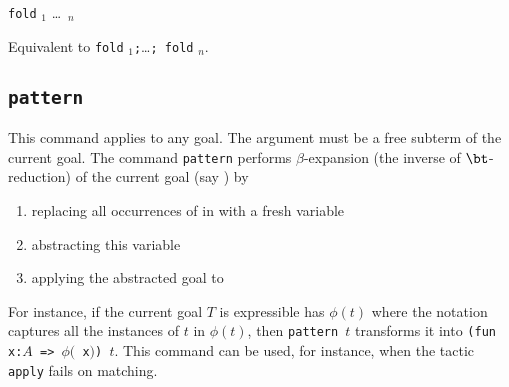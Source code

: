 \begin{Variants}
\item {\tt fold} \term$_1$ \dots\ \term$_n$ 
  
  Equivalent to {\tt fold} \term$_1${\tt;}\ldots{\tt; fold} \term$_n$.
\end{Variants}

\subsection{{\tt pattern {\term}}
\label{pattern}}

This command applies to any goal. The argument {\term} must be a free
subterm of the current goal.  The command {\tt pattern} performs
$\beta$-expansion (the inverse of $\bt$-reduction) of the current goal
(say \T) by
\begin{enumerate}
\item replacing all occurrences of {\term} in {\T} with a fresh variable
\item abstracting this variable
\item applying the abstracted goal to {\term}
\end{enumerate}

For instance, if the current goal $T$ is expressible has $\phi(t)$
where the notation captures all the instances of $t$ in $\phi(t)$,
then {\tt pattern $t$} transforms it into {\tt (fun x:$A$ => $\phi(${\tt
x}$)$) $t$}.  This command can be used, for instance, when the tactic
{\tt apply} fails on matching.

